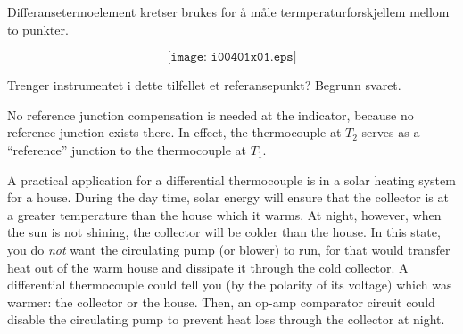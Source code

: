

Differansetermoelement kretser brukes for å måle termperaturforskjellem mellom to punkter. 

$$\texttt{[image: i00401x01.eps]}$$


Trenger instrumentet i dette tilfellet et referansepunkt? Begrunn svaret. 









No reference junction compensation is needed at the indicator, because no reference junction exists there.  In effect, the thermocouple at $T_2$ serves as a ``reference'' junction to the thermocouple at $T_1$.

A practical application for a differential thermocouple is in a solar heating system for a house.  During the day time, solar energy will ensure that the collector is at a greater temperature than the house which it warms.  At night, however, when the sun is not shining, the collector will be colder than the house.  In this state, you do {\it not} want the circulating pump (or blower) to run, for that would transfer heat out of the warm house and dissipate it through the cold collector.  A differential thermocouple could tell you (by the polarity of its voltage) which was warmer: the collector or the house.  Then, an op-amp comparator circuit could disable the circulating pump to prevent heat loss through the collector at night.












